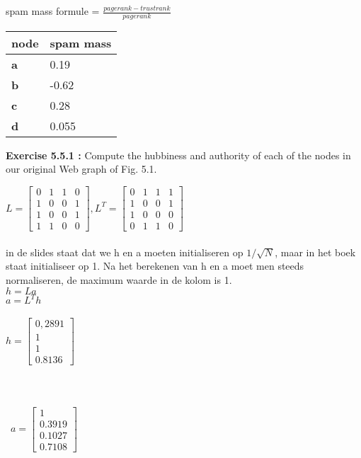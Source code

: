 \documentclass{exam}
\begin{document}
\begin{questions}
spam mass formule = $\frac{pagerank - trustrank}{pagerank}$

    \begin{tabular}{ | l | l | }
    \hline
    \textbf{node} & \textbf{spam mass} \\ \hline
    \textbf{a} & 0.19 \\ \hline
    \textbf{b} & -0.62\\ \hline
    \textbf{c} &  0.28 \\ \hline
    \textbf{d} &  0.055 \\
    \hline
    \end{tabular}



\question \textbf{Exercise 5.5.1 :} Compute the hubbiness and authority of each of the nodes in our original Web graph of Fig. 5.1.

$L = \begin{bmatrix}0 & 1 & 1 & 0 \\ 
1 & 0 & 0 & 1 \\ 
1 & 0 & 0 & 1 \\ 
1 & 1 & 0 & 0 \end{bmatrix}, L^T = \begin{bmatrix}0 & 1 & 1 & 1 \\ 
1 & 0 & 0 & 1 \\ 
1 & 0 & 0 & 0 \\ 
0 & 1 & 1 & 0 \end{bmatrix}$\\\\

in de slides staat dat we h en a moeten initialiseren op $1/\sqrt{N}$, maar in het boek staat initialiseer op 1. Na het berekenen van h en a moet men steeds normaliseren, de maximum waarde in de kolom is 1.\\
$h = La$\\
$a = L^Th$\\\\

$h = \begin{bmatrix}0,2891  \\ 
1  \\ 
1  \\ 
0.8136  \end{bmatrix}$\\\\\\\\\
$a = \begin{bmatrix}1  \\ 
0.3919  \\ 
0.1027  \\ 
0.7108  \end{bmatrix}$\\
\end{questions}
\end{document}

